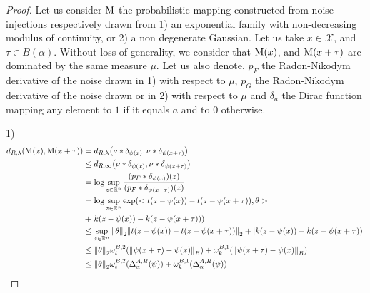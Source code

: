 \begin{proof}
  Let us consider $\operatorname*{M}$ the probabilistic mapping constructed from noise injections respectively drawn from 1) an exponential family with non-decreasing modulus of continuity, or 2) a non degenerate Gaussian.
  Let us take $x \in \mathcal{X}$, and $\tau \in B(\alpha)$.
  Without loss of generality, we consider that $\operatorname*{M}(x)$, and $\operatorname*{M}(x + \tau)$ are dominated by the same measure $\mu$.
  Let us also denote, $p_F$ the Radon-Nikodym derivative of the noise drawn in 1) with respect to $\mu$, $p_G$ the Radon-Nikodym derivative of the noise drawn or in 2) with respect to $\mu$ and $ \delta_a$ the Dirac function mapping any element to $1$ if it equals $a$ and to 0 otherwise.

  1)\begin{align*}
    d_{R,\lambda} \left( \probmap(x), \probmap(x + \tau) \right) &= d_{R, \lambda} \left(\nu * \delta_{\psi(x)}, \nu * \delta_{\psi(x + \tau)}  \right) \\
    &\leq d_{R,\infty}\left(\nu * \delta_{\psi(x)},\nu * \delta_{\psi(x+\tau)}  \right) \\
    &=\log \sup\limits_{z \in \mathbb{R}^{n}} \frac{(p_F * \delta_{\psi(x)})(z)}{(p_F * \delta_{\psi(x+\tau)})(z)} \\
    &=\log \sup\limits_{z \in \mathbb{R}^{n}} \exp\left(<t(z-\psi(x)) - t(z-\psi(x + \tau)),\theta> \right. \\
    \quad &+ \left. k(z -\psi(x))-k(z-\psi(x +\tau)) \right) \\
    &\leq  \sup\limits_{z \in \mathbb{R}^{n}} \norm{\theta}_2 \norm{t(z-\psi(x)) - t(z-\psi(x + \tau))}_2 + | k(z-\psi(x)) - k(z-\psi(x + \tau)) | \\
    &\leq \norm{\theta}_2 \omega^{B,2}_t(\norm{\psi(x + \tau) - \psi(x)}_B) +\omega^{B,1}_k(\norm{\psi(x + \tau) - \psi(x)}_B) \\
    &\leq \norm{\theta}_2 \omega^{B,2}_t(\Delta^{A,B}_{\alpha}(\psi)) +\omega^{B,1}_k(\Delta^{A,B}_{\alpha}(\psi))
  \end{align*}


\end{proof}
